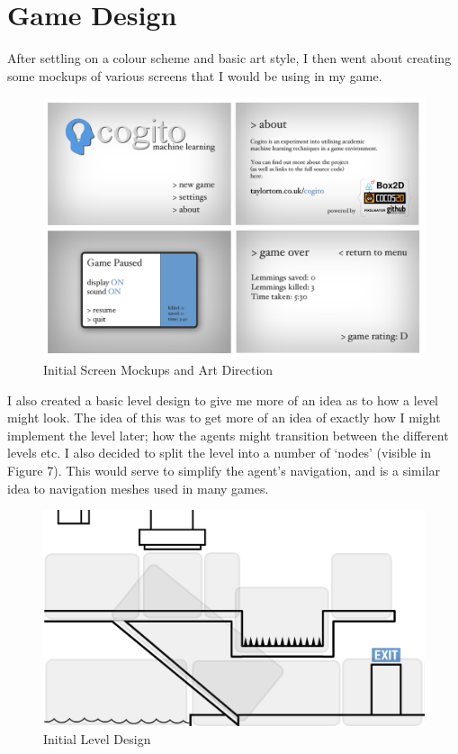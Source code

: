 \documentclass[a4paper,oneside]{report}
\begin{document}
\section{Game Design}

After settling on a colour scheme and basic art style, I then went about creating some mockups of various screens that I would be using in my game.
	
\begin{figure}[h!]
  \centering
    \includegraphics[width=140mm]{sources/images/Screens}
    \caption{Initial Screen Mockups and Art Direction}
\end{figure}

I also created a basic level design to give me more of an idea as to how a level might look. The idea of this was to get more of an idea of exactly how I might implement the level later; how the agents might transition between the different levels etc. I also decided to split the level into a number of `nodes' (visible in Figure 7). This would serve to simplify the agent's navigation, and is a similar idea to navigation meshes used in many games.  

\begin{figure}[h!]
  \centering
    \includegraphics[width=120mm]{sources/images/LevelDesign}
    \caption{Initial Level Design}
\end{figure}
	
\end{document}
